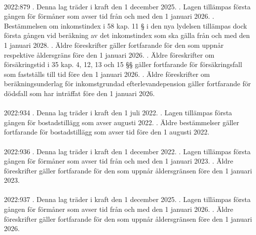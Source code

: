 \documentclass[a4paper,notitlepage,openany,10pt]{book}
\begin{document}
\paragraph*{}
2022:879
. Denna lag träder i kraft den 1 december 2025.
. Lagen tillämpas första gången för förmåner som avser tid från och med den 1 januari 2026.
. Bestämmelsen om inkomstindex i 58 kap. 11 § i den nya lydelsen tillämpas dock första gången vid beräkning av det inkomstindex som ska gälla från och med den 1 januari 2028.
. Äldre föreskrifter gäller fortfarande för den som uppnår respektive åldersgräns före den 1 januari 2026.
. Äldre föreskrifter om försäkringstid i 35 kap. 4, 12, 13 och 15 §§ gäller fortfarande för försäkringsfall som fastställs till tid före den 1 januari 2026.
. Äldre föreskrifter om beräkningsunderlag för inkomstgrundad efterlevandepension gäller fortfarande för dödsfall som har inträffat före den 1 januari 2026.
\paragraph*{}
2022:934
. Denna lag träder i kraft den 1 juli 2022.
. Lagen tillämpas första gången för bostadstillägg som avser augusti 2022.
. Äldre bestämmelser gäller fortfarande för bostadstillägg som avser tid före den 1 augusti 2022.
\paragraph*{}
2022:936
. Denna lag träder i kraft den 1 december 2022.
. Lagen tillämpas första gången för förmåner som avser tid från och med den 1 januari 2023.
. Äldre föreskrifter gäller fortfarande för den som uppnår åldersgränsen före den 1 januari 2023.
\paragraph*{}
2022:937
. Denna lag träder i kraft den 1 december 2025.
. Lagen tillämpas första gången för förmåner som avser tid från och med den 1 januari 2026.
. Äldre föreskrifter gäller fortfarande för den som uppnår åldersgränsen före den 1 januari 2026.
\end{document}
